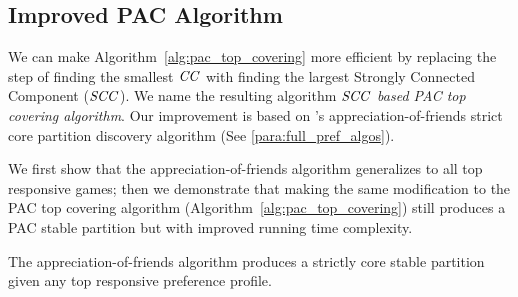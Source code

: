\subsection{Improved PAC Algorithm}
\label{subsec:improved_pac_algorithm}
We can make Algorithm~\ref{alg:pac_top_covering} more efficient
by replacing the step of finding the smallest $\mathit{CC}$ with finding the largest
Strongly Connected Component ($\mathit{SCC}$).
We name the resulting algorithm \textit{$\mathit{SCC}$ based PAC top covering algorithm}.
Our improvement is based on 's appreciation-of-friends
strict core partition discovery algorithm (See \autoref{para:full_pref_algos}).

We first show that the appreciation-of-friends algorithm generalizes to all top
responsive games; then we demonstrate that making the same modification to the
PAC top covering algorithm (Algorithm~\ref{alg:pac_top_covering}) still produces
a PAC stable partition but with improved running time complexity.

\begin{proposition}
\label{prop:scc_generalizes}
  The appreciation-of-friends algorithm produces a strictly core stable partition given any top responsive preference profile.
\end{proposition}

